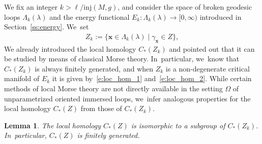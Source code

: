 \documentclass[JEP,XML,SOM,Unicode,NoFloatCountersInSection,published]{cedram}
\let\sep\mid
\let\bm\boldsymbol
\newcommand{\xx}{\bm{x}}
\newcommand{\inj}{\mathrm{inj}}
\theoremstyle{plain}
\newtheorem{Lemma}[Thm]{Lemma}
\theoremstyle{definition}
\begin{document}
We fix an integer $k>\ell/\inj(M,g)$, and consider the space of broken geodesic loops $\Lambda_k(\lambda)$ and the energy functional $E_k:\Lambda_k(\lambda)\to[0,\infty)$ introduced in Section~\ref{ss:energy}. We~set
\begin{align*}
Z_k:=\big\{\xx\in\Lambda_k(\lambda)\sep \gamma_{\xx}\in Z \big\},
\end{align*}
We already introduced the local homology $C_*(Z_k)$ and pointed out that it can be studied by means of classical Morse theory. In~particular, we~know that $C_*(Z_k)$ is always finitely generated, and when $Z_k$ is a non-degenerate critical manifold of $E_k$ it is given by~\eqref{e:loc_hom_1} and~\eqref{e:loc_hom_2}. While certain methods of local Morse theory are not directly available in the setting $\Omega$ of unparametrized oriented immersed loops, we~infer analogous properties for the local homology $C_*(Z)$ from those of $C_*(Z_k)$.

\begin{Lemma}\label{l:finitely_generated}
The local homology $C_*(Z)$ is isomorphic to a subgroup of $C_*(Z_k)$. In~particular, $C_*(Z)$ is finitely generated.
\end{Lemma}
\end{document}
